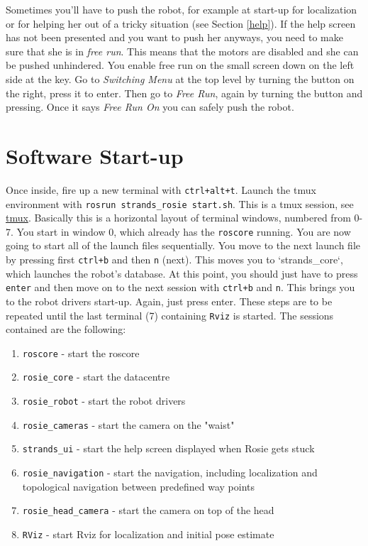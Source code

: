 \documentclass[a4paper,11pt]{article}
\begin{document}
Sometimes you'll have to push the robot, for example at start-up for localization
or for helping her out of a tricky situation (see Section \ref{help}).
If the help screen has not been presented and you want to push her anyways,
you need to make sure that she is in \textit{free run}. This means that
the motors are disabled and she can be pushed unhindered. You enable free run
on the small screen down on the left side at the key. Go to \textit{Switching Menu}
at the top level by turning the button on the right, press it to enter. Then
go to \textit{Free Run}, again by turning the button and pressing. Once it says
\textit{Free Run On} you can safely push the robot.

\section{Software Start-up}
\label{startup}

Once inside, fire up a new terminal with \texttt{ctrl+alt+t}. Launch the tmux environment with \texttt{rosrun strands\_rosie start.sh}. This is a tmux session, see \href{https://www.digitalocean.com/community/tutorials/how-to-install-and-use-tmux-on-ubuntu-12-10--2}{tmux}. Basically this is a horizontal layout of terminal windows, numbered from 0-7. You start in window 0, which already has the  \texttt{roscore} running. You are now going to start all of the launch files sequentially. You move to the next launch file by pressing first \texttt{ctrl+b} and then \texttt{n} (next). This moves you to `strands\_core`, which launches the robot's database. At this point, you should just have to press \texttt{enter} and then move on to the next session with \texttt{ctrl+b} and \texttt{n}. This brings you to the robot drivers start-up. Again, just press enter. These steps are to be repeated until the last terminal (7) containing \texttt{Rviz} is started. The sessions contained are the following:

\begin{enumerate}[start=0]
\item \texttt{roscore} - start the roscore

\item \texttt{rosie\_core} - start the datacentre

\item \texttt{rosie\_robot} - start the robot drivers

\item \texttt{rosie\_cameras} - start the camera on the "waist"

\item \texttt{strands\_ui} - start the help screen displayed when Rosie gets stuck

\item \texttt{rosie\_navigation} - start the navigation, including localization and topological navigation between predefined way points

\item \texttt{rosie\_head\_camera} - start the camera on top of the head

\item \texttt{RViz} - start Rviz for localization and initial pose estimate
\end{enumerate}
\end{document}

